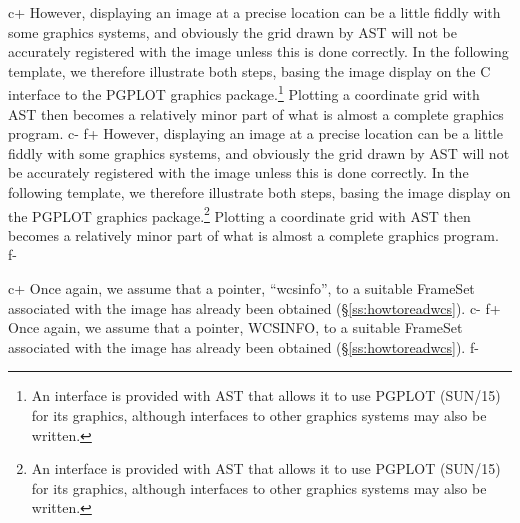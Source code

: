 \documentclass[twoside,11pt]{article}
\newcommand{\xref}[3]{#1}
\newcommand{\secref}[1]{\S\ref{#1}}
\newcommand{\secref}[1]{\ref{#1}}
\begin{document}
c+
However, displaying an image at a precise location can be a little
fiddly with some graphics systems, and obviously the grid drawn by AST
will not be accurately registered with the image unless this is done
correctly. In the following template, we therefore illustrate both
steps, basing the image display on the C interface to the PGPLOT
graphics package.\footnote{An interface is provided with AST that
allows it to use PGPLOT (\xref{SUN/15}{sun15}{}) for its graphics,
although interfaces to other graphics systems may also be written.}
Plotting a coordinate grid with AST then becomes a relatively minor
part of what is almost a complete graphics program.
c-
f+
However, displaying an image at a precise location can be a little
fiddly with some graphics systems, and obviously the grid drawn by AST
will not be accurately registered with the image unless this is done
correctly. In the following template, we therefore illustrate both
steps, basing the image display on the PGPLOT graphics
package.\footnote{An interface is provided with AST that allows it to
use PGPLOT (\xref{SUN/15}{sun15}{}) for its graphics, although
interfaces to other graphics systems may also be written.}  Plotting a
coordinate grid with AST then becomes a relatively minor part of what
is almost a complete graphics program.
f-

c+
Once again, we assume that a pointer, ``wcsinfo'', to a suitable
FrameSet associated with the image has already been obtained
(\secref{ss:howtoreadwcs}).
c-
f+
Once again, we assume that a pointer, WCSINFO, to a suitable FrameSet
associated with the image has already been obtained
(\secref{ss:howtoreadwcs}).
f-
\end{document}
